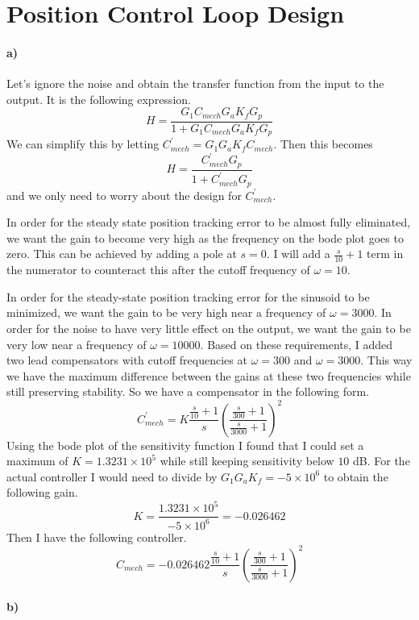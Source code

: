 \documentclass[12pt]{article}
\begin{document}
\section{Position Control Loop Design}

\paragraph{a)}

Let's ignore the noise and obtain the transfer function from the input to the output. It is the following expression.
\[H = \frac{G_1C_{mech}G_aK_fG_p}{1+G_1C_{mech}G_aK_fG_p}\]
We can simplify this by letting \(C^\prime_{mech}=G_1G_aK_fC_{mech}\). Then this becomes
\[H = \frac{C^\prime_{mech}G_p}{1+C^\prime_{mech}G_p}\]
and we only need to worry about the design for \(C^\prime_{mech}\).

In order for the steady state position tracking error to be almost fully eliminated, we want the gain to
become very high as the frequency on the bode plot goes to zero. This can be achieved by adding a pole at \(s=0\).
I will add a \(\frac{s}{10}+1\) term in the numerator to counteract this after the cutoff frequency of \(\omega=10\).

In order for the steady-state position tracking error for the sinusoid to be minimized, we want the gain to be very
high near a frequency of \(\omega=3000\). In order for the noise to have very little effect on the output, we want the gain
to be very low near a frequency of \(\omega=10000\). Based on these requirements, I added two lead compensators with
cutoff frequencies at \(\omega=300\) and \(\omega=3000\). This way we have the maximum difference between the gains at these
two frequencies while still preserving stability. So we have a compensator in the following form.
\[C^\prime_{mech}=K\frac{\frac{s}{10}+1}{s}\left(\frac{\frac{s}{300}+1}{\frac{s}{3000}+1}\right)^2\]
Using the bode plot of the sensitivity function I found that I could set a maximum of \(K=1.3231\times 10^5\) while still
keeping sensitivity below \(10\) dB. For the actual controller I would need to divide by \(G_1G_aK_f=-5\times 10^6\) to
obtain the following gain.
\[K=\frac{1.3231\times10^5}{-5\times 10^6}=-0.026462\]
Then I have the following controller.
\[C_{mech}=-0.026462\frac{\frac{s}{10}+1}{s}\left(\frac{\frac{s}{300}+1}{\frac{s}{3000}+1}\right)^2\]

\paragraph{b)}
\end{document}
